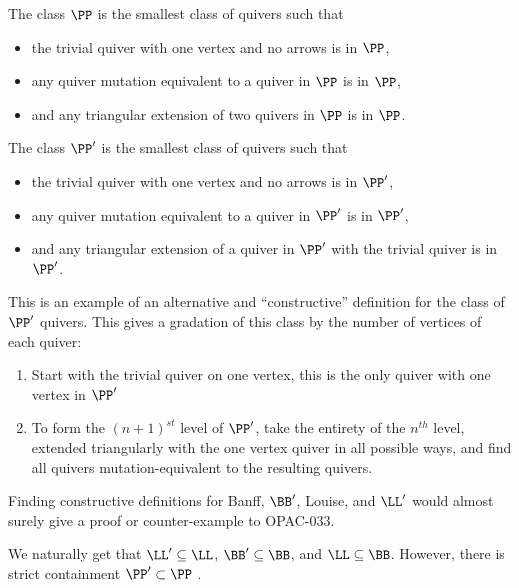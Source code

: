  \begin{defi}\label{def-P}
    The class $\PP$ is the smallest class of quivers such that 
    \begin{itemize}
        \item the trivial quiver with one vertex and no arrows is in $\PP$,
        \item any quiver mutation equivalent to a quiver in $\PP$ is in $\PP$, 
        \item and any triangular extension of two quivers in $\PP$ is in $\PP$.
    \end{itemize}
 \end{defi}

 \begin{defi}\label{def-Pprime}
    The class $\PP'$ is the smallest class of quivers such that 
    \begin{itemize}
        \item the trivial quiver with one vertex and no arrows is in $\PP'$,
        \item any quiver mutation equivalent to a quiver in $\PP'$ is in $\PP'$, 
        \item and any triangular extension of a quiver in $\PP'$ with the trivial quiver is in $\PP'$.
    \end{itemize}
 \end{defi}


\begin{exam}\label{exa-constructive}
    This is an example of an alternative and ``constructive'' definition for the class of $\PP'$ quivers. This gives a gradation of this class by the number of vertices of each quiver:
    \begin{enumerate}
        \item Start with the trivial quiver on one vertex, this is the only quiver with one vertex in $\PP'$
        \item To form the $(n+1)^{st}$ level of $\PP'$, take the entirety of the $n^{th}$ level, extended triangularly with the one vertex quiver in all possible ways, and find all quivers mutation-equivalent to the resulting quivers.
    \end{enumerate}
    Finding constructive definitions for Banff, $\BB'$, Louise, and $\LL'$ would almost surely give a proof or counter-example to OPAC-033.
\end{exam}


\begin{rema} \label{rmk-subclasses}
    We naturally get that $\LL' \subseteq \LL$, $\BB' \subseteq \BB$, and $\LL \subseteq \BB$.
    However, there is strict containment $\PP' \subset \PP$ \cite[Remark 4.21]{ladkani_cluster_2013}.
\end{rema}

